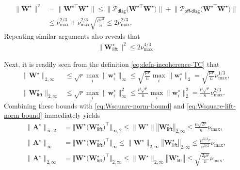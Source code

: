 %
\begin{align}
	\big\|\bm{W}^{\star}\big\|^2 & = \big\| \bm{W}^{\star\top} \bm{W}^{\star}\big\|
	\leq \Big\|\mathcal{P}_{\mathsf{diag}}\big( \bm{W}^{\star\top} \bm{W}^{\star}\big)\Big\|+\Big\|\mathcal{P}_{\mathsf{off}\text{-}\mathsf{diag}}\big( \bm{W}^{\star\top} \bm{W}^{\star}\big)\Big\| \nonumber\\
	& \leq \nu_{\max}^{2/3} + \nu_{\max}^{2/3}\sqrt{\frac{\mu r^{2}}{n}} \leq  2\nu_{\max}^{2/3}.
	\label{eq:Wsquare-norm-bound}
\end{align}
%
Repeating similar arguments also reveals that
%
\begin{align}
	\big\|\bm{W}^{\star}_{\mathsf{lift}}\big\|^2  \leq  2\nu_{\max}^{4/3}.
	\label{eq:Wsquare-lift-norm-bound}
\end{align}
%



Next, it is readily seen from the definition \eqref{eq:defn-incoherence-TC}  that
%
\begin{align*}
	\big\|\bm{W}^{\star}\big\|_{2,\infty} & \leq\sqrt{r}\max_{i}\|\bm{w}_{i}^{\star}\|_{\infty}\leq\sqrt{\frac{\mu r}{n}}\max_{i}\|\bm{w}_{i}^{\star}\|_{2}
	=\sqrt{\frac{\mu r}{n}} \nu_{\max}^{1/3},\\
\big\|\bm{W}_{\mathsf{lift}}^{\star}\big\|_{2,\infty} & \leq\sqrt{r}\max_{i}\|\bm{w}_{i}^{\star}\|_{\infty}^{2}\leq\frac{\mu \sqrt{r}}{n}\max_{i}\|\bm{w}_{i}^{\star}\|_{2}^{2}
	=\frac{\mu \sqrt{r}}{n} \nu_{\max}^{2/3}.
\end{align*}
%
Combining these bounds with \eqref{eq:Wsquare-norm-bound} and \eqref{eq:Wsquare-lift-norm-bound} immediately yields
%
\begin{align*}
\big\|\bm{A}^{\star}\big\|_{\infty,2} & =\Big\Vert\bm{W}^{\star}\big(\bm{W}_{\mathsf{lift}}^{\star}\big)^{\top}\Big\Vert_{\infty,2}\leq\|\bm{W}^{\star}\|\left\Vert \bm{W}_{\mathsf{lift}}^{\star}\right\Vert _{2,\infty}\leq\frac{\mu\sqrt{2r}}{n}\nu_{\max} ,\\
\big\|\bm{A}^{\star}\big\|_{\infty} & =\Big\Vert\bm{W}^{\star}\big(\bm{W}_{\mathsf{lift}}^{\star}\big)^{\top}\Big\Vert_{\infty}\leq\|\bm{W}^{\star}\|_{2,\infty}\left\Vert \bm{W}_{\mathsf{lift}}^{\star}\right\Vert _{2,\infty}\leq\frac{\mu^{3/2}r}{n^{3/2}}\nu_{\max} ,\\
\big\|\bm{A}^{\star}\big\|_{2,\infty} & =\Big\Vert\bm{W}^{\star}\big(\bm{W}_{\mathsf{lift}}^{\star}\big)^{\top}\Big\Vert_{2,\infty}\leq\|\bm{W}^{\star}\|_{2,\infty}\left\Vert \bm{W}_{\mathsf{lift}}^{\star}\right\Vert \leq\sqrt{\frac{2\mu r}{n}}\nu_{\max} .
\end{align*}
%



